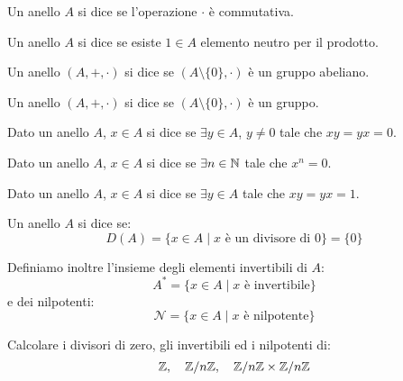 \documentclass[11pt]{scrartcl}
\begin{document}
\begin{definition}
    Un anello $A$ si dice  se l'operazione $\cdot$ è commutativa.
\end{definition}

\begin{definition}
    Un anello $A$ si dice  se esiste $1 \in A$ elemento neutro per il prodotto.
\end{definition}

\begin{definition}
    Un anello $(A,+,\cdot)$ si dice  se $(A\setminus\{0\},\cdot)$ è un gruppo abeliano.
\end{definition}

\begin{definition}
    Un anello $(A,+,\cdot)$ si dice  se $(A\setminus\{0\},\cdot)$ è un gruppo.
\end{definition}

\begin{definition}
    Dato un anello $A$, $x \in A$ si dice  se $\exists y \in A$, $y \ne 0$ tale che $xy=yx=0$.
\end{definition}

\begin{definition}
    Dato un anello $A$, $x \in A$ si dice  se $\exists n \in \mathbb N$ tale che $x^n = 0$.
\end{definition}

\begin{definition}
    Dato un anello $A$, $x \in A$ si dice  se $\exists y \in A$ tale che $xy=yx=1$.
\end{definition}

\begin{definition}
    Un anello $A$ si dice  se:
        \[ D(A) = \{x \in A \mid \text{$x$ è un divisore di $0$}\} = \{0\}
            \]
\end{definition}

Definiamo inoltre l'insieme degli elementi invertibili di $A$:
    \[ A^* = \{x \in A \mid \text{$x$ è invertibile}\}
        \]
e dei nilpotenti:
    \[ \mathcal{N} = \{x \in A \mid \text{$x$ è nilpotente}\} 
        \]

\begin{exercise}
    Calcolare i divisori di zero, gli invertibili ed i nilpotenti di:
        \[ \mathbb Z, \quad {\mathbb Z}/n{\mathbb Z}, \quad {\mathbb Z}/n{\mathbb Z} \times {\mathbb Z}/n{\mathbb Z}
            \]
\end{exercise}
\end{document}
